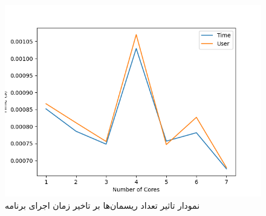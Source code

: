 \documentclass{article}
\begin{document}
\begin{figure}[H]
\centering
\includegraphics[width=\textwidth]{1.3-plot-2.png}
\caption{نمودار تاثیر تعداد ریسمان‌ها بر تاخیر زمان اجرای برنامه}
\end{figure}
\end{document}
